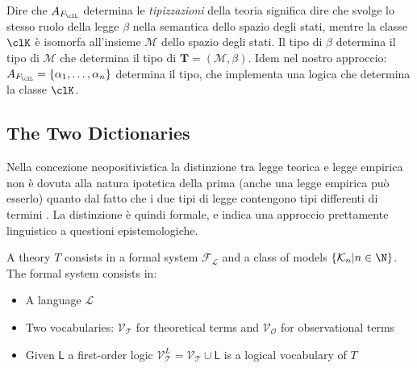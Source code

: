 Dire che $A_{F_\clL}$ determina le \emph{tipizzazioni} della teoria significa
dire che svolge lo stesso ruolo della legge $\beta$ nella semantica dello spazio degli
stati, mentre la classe $\clK$ è isomorfa all'insieme $\mathcal{M}$ dello spazio
degli stati. Il tipo di $\beta$ determina il tipo di $\mathcal{M}$ che determina il
tipo di $\mathbf{T} = (\mathcal{M}, \beta)$. Idem nel nostro approccio: $A_{F_\clL}
	= \{\alpha_1,\dots,\alpha_n\}$ determina il tipo, che implementa una logica che determina
la classe $\clK$.

\subsection{The Two Dictionaries}
Nella concezione neopositivistica la distinzione tra legge teorica e legge empirica non è dovuta alla natura ipotetica della prima (anche una legge empirica può esserlo) quanto dal fatto che i due tipi di legge contengono tipi differenti di termini \cite{carnap-intro}. La distinzione è quindi formale, e indica una approccio prettamente linguistico a questioni epistemologiche.

\begin{definition}
	A theory $T$ consists in a formal system $\mathcal{F_L}$ and a class of models $\{\mathcal{K}_n | n \in \N\}$. The formal system consists in:
	\begin{itemize}
		\item A language $\mathcal{L}$
		\item Two vocabularies: $\mathcal{V_T}$ for theoretical terms and $\mathcal{V_O}$ for observational terms 
		\item Given $\mathsf{L}$ a first-order logic $\mathcal{V}_{\mathcal{T}}^L = \mathcal{V_T} \cup \mathsf{L}$ is a logical vocabulary of $T$
	\end{itemize}    
\end{definition}


